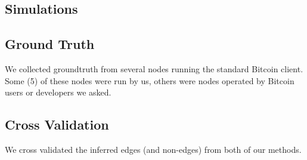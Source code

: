 \subsection{Simulations}


\subsection{Ground Truth}
We collected groundtruth from several nodes running the standard Bitcoin client. Some (5) of these nodes were run by us, others were nodes operated by Bitcoin users or developers we asked. 

\subsection{Cross Validation}
We cross validated the inferred edges (and non-edges) from both of our methods.
